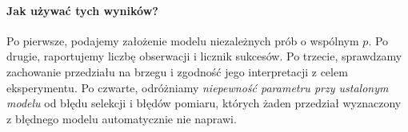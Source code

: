 \paragraph{Jak używać tych wyników?}
Po pierwsze, podajemy założenie modelu niezależnych prób o wspólnym
$p$. Po drugie, raportujemy liczbę obserwacji i licznik sukcesów.
Po trzecie, sprawdzamy zachowanie przedziału na brzegu i zgodność
jego interpretacji z celem eksperymentu. Po czwarte, odróżniamy
\emph{niepewność parametru przy ustalonym modelu} od błędu
selekcji i błędów pomiaru, których żaden przedział wyznaczony z
błędnego modelu automatycznie nie naprawi.

